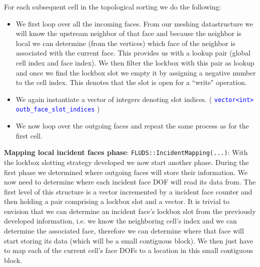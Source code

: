 \documentclass[11pt,letterpaper,titlepage]{article}
\newcommand{\xmltag}[1]{\textcolor{blue}{ \texttt{#1}} }
\numberwithin{equation}{section}
\begin{document}
For each subsequent cell in the topological sorting we do the following:


\begin{itemize}
\item We first loop over all the incoming faces. From our meshing datastructure we will know the upstream neighbor of that face and because the neighbor is local we can determine (from the vertices) which face of the neighbor is associated with the current face. This provides us with a lookup pair (global cell index and face index). We then filter the lockbox with this pair as lookup and once we find the lockbox slot we empty it by assigning a negative number to the cell index. This denotes that the slot is open for a ``write" operation.
\item We again instantiate a vector of integers denoting slot indices.\newline
 (\xmltag{vector<int> outb\_face\_slot\_indices})
\item We now loop over the outgoing faces and repeat the same process as for the first cell. 
\end{itemize}

\bigskip
\bigskip

\textbf{Mapping local incident faces phase}:\newline
\texttt{FLUDS::IncidentMapping(...)}:\newline
With the lockbox slotting strategy developed we now start another phase. During the first phase we determined where outgoing faces will store their information. We now need to determine where each incident face DOF will read its data from.
\newline
\newline
The first level of this structure is a vector incremented by a incident face counter and then holding a pair comprising a lockbox slot and a vector. It is trivial to envision that we can determine an incident face's lockbox slot from the previously developed information, i.e. we know the neighboring cell's index and we can determine the associated face, therefore we can determine where that face will start storing its data (which will be a small contiguous block). We then just have to map each of the current cell's face DOFs to a location in this small contiguous block.
\end{document}
